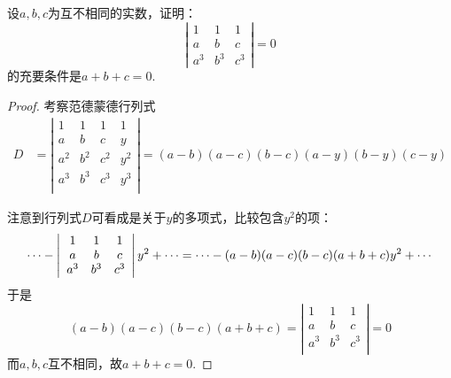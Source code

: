 \begin{li}
  设$a,b,c$为互不相同的实数，证明：
  $$
  \left|
    \begin{array}{ccc}
      1   &   1   &   1\\
      a   &   b   &   c\\
      a^3 &   b^3 &   c^3
    \end{array}
  \right|=0
  $$
  的充要条件是$a+b+c=0$.
\end{li}
\begin{proof}
  考察范德蒙德行列式
  $$
  \begin{array}{ll}
    D & = \left|
        \begin{array}{cccc}
          1   &   1   &   1   & 1\\
          a   &   b   &   c   & y\\
          a^2 &   b^2 &   c^2 & y^2\\
          a^3 &   b^3 &   c^3 & y^3\\
        \end{array}
    \right|
    = (a-b)(a-c)(b-c)(a-y)(b-y)(c-y) 
  \end{array}
  $$
  
  注意到行列式$D$可看成是关于$y$的多项式，比较包含$y^2$的项：
  $$
  \cdots - \left|
    \begin{array}{cccc}
      1   &   1   &   1  \\ 
      a   &   b   &   c  \\
      a^3 &   b^3 &   c^3\\
    \end{array}
  \right| y^2 + \cdots = 
  \cdots -(a-b)(a-c)(b-c)(a+b+c)y^2 + \cdots 
  $$
  于是
  $$
  (a-b)(a-c)(b-c)(a+b+c) = \left|
    \begin{array}{cccc}
      1   &   1   &   1  \\ 
      a   &   b   &   c  \\
      a^3 &   b^3 &   c^3\\
    \end{array}
  \right|
  = 0
  $$
  而$a,b,c$互不相同，故$a+b+c=0$.
\end{proof}

